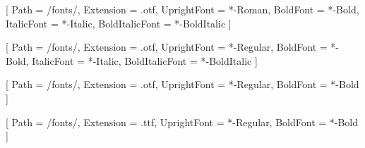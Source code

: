 \usepackage{fontspec}
\usepackage{kotex}

\setmainfont{TimesLTStd}[
    Path = \KGUPCToolkitRoot/fonts/,
    Extension = .otf,
    UprightFont = *-Roman,
    BoldFont = *-Bold,
    ItalicFont = *-Italic,
    BoldItalicFont = *-BoldItalic
    ]

\setsansfont{Inter}[
    Path = \KGUPCToolkitRoot/fonts/,
    Extension = .otf,
    UprightFont = *-Regular,
    BoldFont = *-Bold,
    ItalicFont = *-Italic,
	BoldItalicFont = *-BoldItalic
    ]


[
    Path = \KGUPCToolkitRoot/fonts/,
    Extension = .otf,
    UprightFont = *-Regular,
    BoldFont = *-Bold
    ]

[
    Path = \KGUPCToolkitRoot/fonts/,
    Extension = .ttf,
    UprightFont = *-Regular,
    BoldFont = *-Bold
    ]
